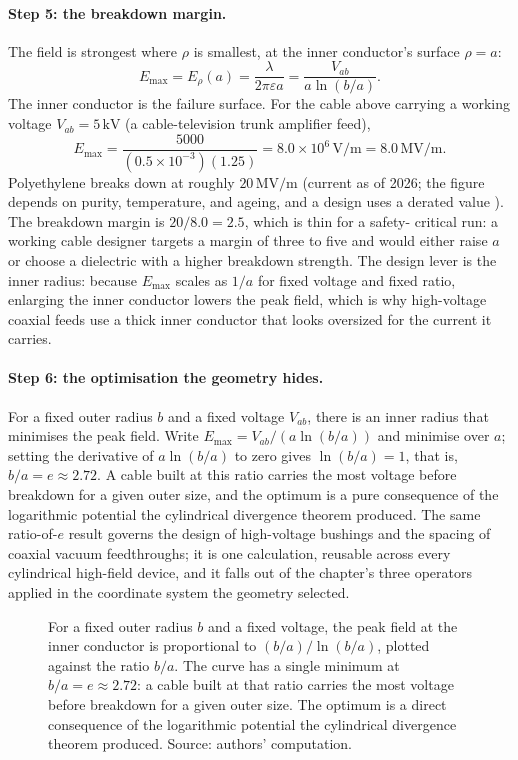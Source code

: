 \paragraph{Step 5: the breakdown margin.} The field is strongest where
$\rho$ is smallest, at the inner conductor's surface $\rho = a$:
\[
E_{\max} = E_{\rho}(a) = \frac{\lambda}{2\pi\varepsilon a} =
\frac{V_{ab}}{a\ln(b/a)}.
\]
The inner conductor is the failure surface. For the cable above
carrying a working voltage $V_{ab} = 5\,\si{\kilo\volt}$ (a
cable-television trunk amplifier feed),
\[
E_{\max} = \frac{5000}{(0.5\times 10^{-3})(1.25)} = 8.0\times 10^{6}
\,\si{\volt\per\meter} = 8.0\,\si{\mega\volt\per\meter}.
\]
Polyethylene breaks down at roughly $20\,\si{\mega\volt\per\meter}$
(current as of 2026; the figure depends on purity, temperature, and
ageing, and a design uses a derated value \cite{text:v2ch08-griffiths-em-2017}).
The breakdown margin is $20/8.0 = 2.5$, which is thin for a safety-
critical run: a working cable designer targets a margin of three to
five and would either raise $a$ or choose a dielectric with a higher
breakdown strength. The design lever is the inner radius: because
$E_{\max}$ scales as $1/a$ for fixed voltage and fixed ratio,
enlarging the inner conductor lowers the peak field, which is why
high-voltage coaxial feeds use a thick inner conductor that looks
oversized for the current it carries.

\paragraph{Step 6: the optimisation the geometry hides.} For a fixed
outer radius $b$ and a fixed voltage $V_{ab}$, there is an inner radius
that minimises the peak field. Write $E_{\max} = V_{ab}/(a\ln(b/a))$
and minimise over $a$; setting the derivative of $a\ln(b/a)$ to zero
gives $\ln(b/a) = 1$, that is, $b/a = e \approx 2.72$. A cable built at
this ratio carries the most voltage before breakdown for a given outer
size, and the optimum is a pure consequence of the logarithmic
potential the cylindrical divergence theorem produced. The same
ratio-of-$e$ result governs the design of high-voltage bushings and
the spacing of coaxial vacuum feedthroughs; it is one calculation,
reusable across every cylindrical high-field device, and it falls out
of the chapter's three operators applied in the coordinate system the
geometry selected.

\begin{figure}[h]
  \centering
  
  \caption[Peak coaxial field versus radius ratio.]{For a fixed outer
  radius $b$ and a fixed voltage, the peak field at the inner conductor
  is proportional to $(b/a)/\ln(b/a)$, plotted against the ratio
  $b/a$. The curve has a single minimum at $b/a = e \approx 2.72$: a
  cable built at that ratio carries the most voltage before breakdown
  for a given outer size. The optimum is a direct consequence of the
  logarithmic potential the cylindrical divergence theorem produced.
  Source: authors' computation.}
  \label{fig:vol02:ch08:coax-optimum}
\end{figure}

